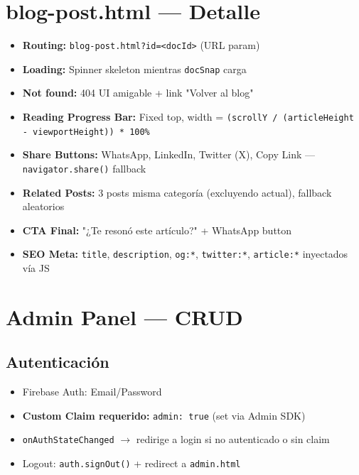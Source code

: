\documentclass[12pt,a4paper,spanish]{report}
\begin{document}
\section{blog-post.html — Detalle}
\begin{itemize}
    \item \textbf{Routing:} \texttt{blog-post.html?id=<docId>} (URL param)
    \item \textbf{Loading:} Spinner skeleton mientras \texttt{docSnap} carga
    \item \textbf{Not found:} 404 UI amigable + link "Volver al blog"
    \item \textbf{Reading Progress Bar:} Fixed top, width = \texttt{(scrollY / (articleHeight - viewportHeight)) * 100\%}
    \item \textbf{Share Buttons:} WhatsApp, LinkedIn, Twitter (X), Copy Link — \texttt{navigator.share()} fallback
    \item \textbf{Related Posts:} 3 posts misma categoría (excluyendo actual), fallback aleatorios
    \item \textbf{CTA Final:} "¿Te resonó este artículo?" + WhatsApp button
    \item \textbf{SEO Meta:} \texttt{title}, \texttt{description}, \texttt{og:*}, \texttt{twitter:*}, \texttt{article:*} inyectados vía JS
\end{itemize}

\section{Admin Panel — CRUD}

\subsection{Autenticación}
\begin{itemize}
    \item Firebase Auth: Email/Password
    \item \textbf{Custom Claim requerido:} \texttt{admin: true} (set via Admin SDK)
    \item \texttt{onAuthStateChanged} $\rightarrow$ redirige a login si no autenticado o sin claim
    \item Logout: \texttt{auth.signOut()} + redirect a \texttt{admin.html}
\end{itemize}
\end{document}
